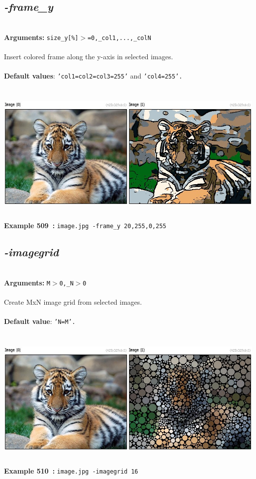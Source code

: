 \documentclass[a4paper,11pt,twoside]{book}
\begin{document}
\subsection{\emph{-frame\_y} }\vspace*{-0.5em}
~\\\textbf{Arguments: } 
{\small \texttt{size\_y[\%]$>$=0,\_col1,...,\_colN}}\\~\\
Insert colored frame along the y-axis in selected images.
~\\~\\\textbf{Default values}: {\small \texttt{'col1=col2=col3=255'} and \texttt{'col4=255'.}}
\begin{center}\includegraphics[keepaspectratio=true,height=7cm,width=\textwidth]{img/gmic_def509.jpg}\\
{\footnotesize \textbf{Example 509~:} \texttt{image.jpg -frame\_y 20,255,0,255}}
\end{center}

\subsection{\emph{-imagegrid} }\vspace*{-0.5em}
~\\\textbf{Arguments: } 
{\small \texttt{M$>$0,\_N$>$0}}\\~\\
Create MxN image grid from selected images.
~\\~\\\textbf{Default value}: {\small \texttt{'N=M'.}}
\begin{center}\includegraphics[keepaspectratio=true,height=7cm,width=\textwidth]{img/gmic_def510.jpg}\\
{\footnotesize \textbf{Example 510~:} \texttt{image.jpg -imagegrid 16}}
\end{center}
\end{document}
